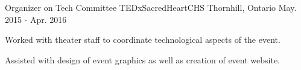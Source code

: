 \begin{cventries}
  \cventry
    {Organizer on Tech Committee } %
    {TEDxSacredHeartCHS} %
    {Thornhill, Ontario} %
    {May. 2015 - Apr. 2016} %
    {
      \begin{cvitems} %
        \item {Worked with theater staff to coordinate technological aspects of the event.}
        \item {Assisted with design of event graphics as well as creation of event website.}
      \end{cvitems}
    }

\end{cventries}
